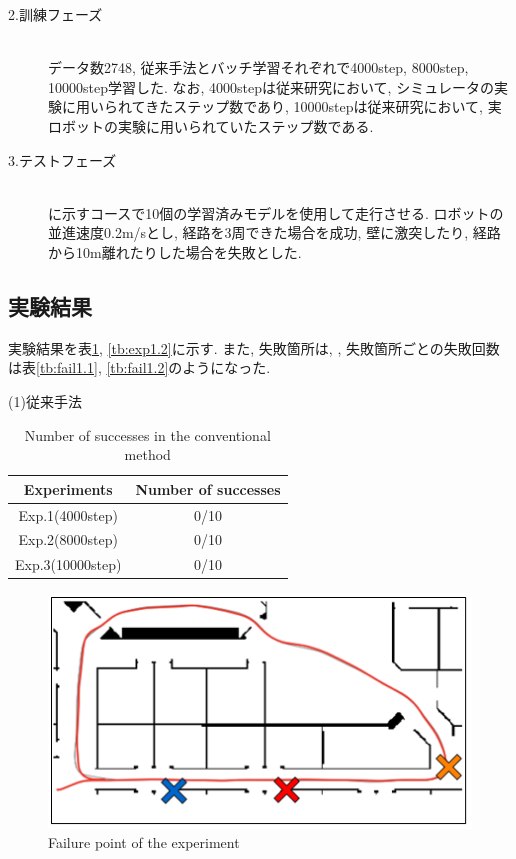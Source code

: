 \newpage
\begin{description}
  \item[2.訓練フェーズ]\mbox{}\\データ数2748, 従来手法とバッチ学習それぞれで4000step, 8000step, 10000step学習した. なお, 4000stepは従来研究において, シミュレータの実験に用いられてきたステップ数であり, 10000stepは従来研究において, 実ロボットの実験に用いられていたステップ数である. 
\end{description}

\begin{description}
  \item[3.テストフェーズ]\mbox{}\\ に示すコースで10個の学習済みモデルを使用して走行させる. ロボットの並進速度0.2m/sとし, 経路を3周できた場合を成功, 壁に激突したり, 経路から10m離れたりした場合を失敗とした.
\end{description}

\subsection{実験結果}
実験結果を表\ref{tb:exp1.1}, \ref{tb:exp1.2}に示す. また, 失敗箇所は, , 失敗箇所ごとの失敗回数は表\ref{tb:fail1.1}, \ref{tb:fail1.2}のようになった. 

\newpage
\begin{description}
  \item [(1)従来手法]
\end{description}

\begin{table}[h]
  \centering
  \begin{tabular}{|c|c|} \hline
    Experiments & Number of successes \\ \hline
    Exp.1(4000step) & 0/10 \\ \hline
    Exp.2(8000step) & 0/10 \\ \hline
    Exp.3(10000step) & 0/10 \\ \hline
  \end{tabular}
  \caption{Number of successes in the conventional method}
  \label{tb:exp1.1}
\end{table}

\begin{figure}[h]
  \centering
  \includegraphics[keepaspectratio, scale=0.5]{images/result1.png}
  \caption{Failure point of the experiment}
  \label{Fig:result1.1}
  \end{figure}

